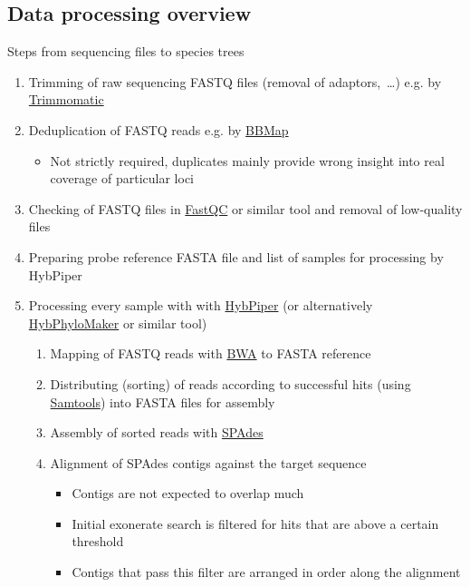 \documentclass[compress, ucs, xelatex, 11pt, xcolor=x11names, aspectratio=169,
	hyperref={
		bookmarks=true,
		unicode=true,
		colorlinks=true,
		pdftitle={HybSeq course},
		plainpages=false,
		pdfauthor={Vojtech Zeisek},
		pdfsubject={Practical processing of HybSeq target enrichment sequencing data on computing grids like MetaCentrum},
		pdfcreator={XeLaTeX},
		pdfkeywords={BASH, command line, GNU, HybSeq, Linux, MetaCentrum, sequencing shell, target enrichment},
		linkcolor=Cyan2, %
		anchorcolor=Firebrick2, %
		citecolor=Firebrick2, %
		filecolor=Firebrick2, %
		menucolor=Firebrick2, %
		urlcolor=Chartreuse2, %
		pdftex},
	url={hyphens, lowtilde} %
	]{beamer}
\begin{document}
\subsection{Data processing overview}

\begin{frame}[allowframebreaks]{Steps from sequencing files to species trees}
	\begin{enumerate}
		\item Trimming of raw sequencing FASTQ files (removal of adaptors,~\ldots) e.g. by \href{http://www.usadellab.org/cms/?page=trimmomatic}{Trimmomatic}
		\item Deduplication of FASTQ reads e.g. by \href{https://sourceforge.net/projects/bbmap/}{BBMap}
		\begin{itemize}
			\item Not strictly required, duplicates mainly provide wrong insight into real coverage of particular loci
		\end{itemize}
		\item Checking of FASTQ files in \href{https://www.bioinformatics.babraham.ac.uk/projects/fastqc/}{FastQC} or similar tool and removal of low-quality files
		\item Preparing probe reference FASTA file and list of samples for processing by HybPiper
		\item Processing every sample with with \href{https://github.com/mossmatters/HybPiper/wiki}{HybPiper} (or alternatively \href{https://github.com/tomas-fer/HybPhyloMaker}{HybPhyloMaker} or similar tool)
		\begin{enumerate}
			\item Mapping of FASTQ reads with \href{https://github.com/lh3/bwa}{BWA} to FASTA reference
			\item Distributing (sorting) of reads according to successful hits (using \href{https://github.com/samtools/samtools}{Samtools}) into FASTA files for assembly
			\item Assembly of sorted reads with \href{https://github.com/ablab/spades}{SPAdes}
			\item Alignment of SPAdes contigs against the target sequence
			\begin{itemize}
				\item Contigs are not expected to overlap much
				\item Initial exonerate search is filtered for hits that are above a certain threshold
				\item Contigs that pass this filter are arranged in order along the alignment

\end{itemize}
\end{enumerate}
\end{enumerate}
\end{frame}
\end{document}
